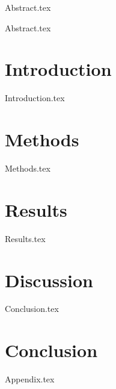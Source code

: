 \documentclass[master]{NTNUthesis}
\begin{document}
\makecover


\begin{abstractZH}
    {Abstract.tex}
\end{abstractZH}

\begin{abstractEN}
    {Abstract.tex}
\end{abstractEN}

\maketoc


\chapter{Introduction}
{Introduction.tex}

\chapter{Methods}
{Methods.tex}

\chapter{Results}
{Results.tex}

\chapter{Discussion}
{Conclusion.tex}

\chapter{Conclusion}

{Appendix.tex}



\end{document}
